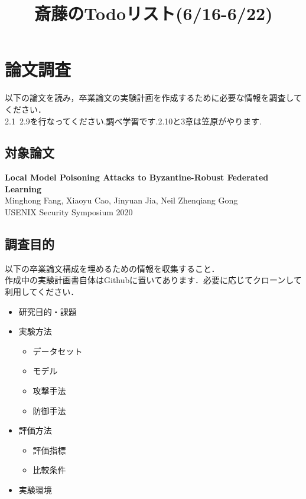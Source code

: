 \documentclass[a4j, twocolumn]{jsarticle}  %
\title{斎藤のTodoリスト(6/16-6/22)}  %
\author{}  %
\date{}  %
\begin{document}
\maketitle  %
\section{論文調査}

以下の論文を読み，卒業論文の実験計画を作成するために必要な情報を調査してください．\\
2.1~2.9を行なってください.調べ学習です.2.10と3章は笠原がやります.

\subsection{対象論文}

\textbf{Local Model Poisoning Attacks to Byzantine-Robust Federated Learning}\\
Minghong Fang, Xiaoyu Cao, Jinyuan Jia, Neil Zhenqiang Gong\\
USENIX Security Symposium 2020

\subsection{調査目的}

以下の卒業論文構成を埋めるための情報を収集すること．\\
作成中の実験計画書自体はGithubに置いてあります．必要に応じてクローンして利用してください．

\begin{itemize}
    \item 研究目的・課題
    \item 実験方法
    \begin{itemize}
        \item データセット
        \item モデル
        \item 攻撃手法
        \item 防御手法
    \end{itemize}
    \item 評価方法
    \begin{itemize}
        \item 評価指標
        \item 比較条件
    \end{itemize}
    \item 実験環境
\end{itemize}
\end{document}
